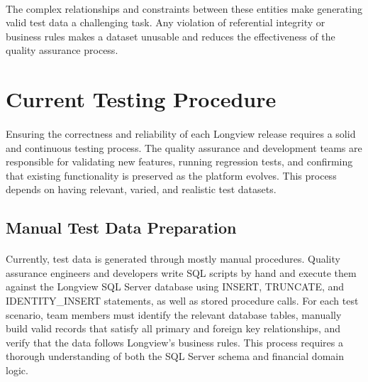 \paragraph{}The complex relationships and constraints between these entities make generating valid test data a challenging task. Any violation of referential integrity or business rules makes a dataset unusable and reduces the effectiveness of the quality assurance process.

\section{Current Testing Procedure}

\paragraph{}Ensuring the correctness and reliability of each Longview release requires a solid and continuous testing process. The quality assurance and development teams are responsible for validating new features, running regression tests, and confirming that existing functionality is preserved as the platform evolves. This process depends on having relevant, varied, and realistic test datasets.

\subsection{Manual Test Data Preparation}

\paragraph{}Currently, test data is generated through mostly manual procedures. Quality assurance engineers and developers write SQL scripts by hand and execute them against the Longview SQL Server database using INSERT, TRUNCATE, and IDENTITY\_INSERT statements, as well as stored procedure calls. For each test scenario, team members must identify the relevant database tables, manually build valid records that satisfy all primary and foreign key relationships, and verify that the data follows Longview's business rules. This process requires a thorough understanding of both the SQL Server schema and financial domain logic.

